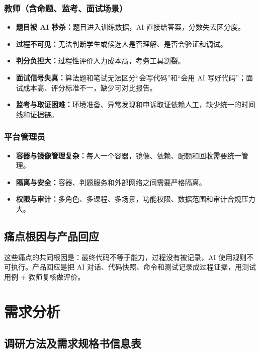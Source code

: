 \documentclass[UTF8,12pt,a4paper]{ctexart}
\begin{document}
\subsubsection{教师（含命题、监考、面试场景）}

\begin{itemize}[leftmargin=2em]
  \item \textbf{题目被 AI 秒杀：}题目进入训练数据，AI 直接给答案，分数失去区分度。
  \item \textbf{过程不可见：}无法判断学生或候选人是否理解、是否会验证和调试。
  \item \textbf{判分负担大：}过程性评价人力成本高，考务工具割裂。
  \item \textbf{面试信号失真：}算法题和笔试无法区分“会写代码”和“会用 AI 写好代码”；面试成本高、评分标准不一，缺少可对比报告。
  \item \textbf{监考与取证困难：}环境准备、异常发现和申诉取证依赖人工，缺少统一的时间线和证据链。
\end{itemize}

\subsubsection{平台管理员}

\begin{itemize}[leftmargin=2em]
  \item \textbf{容器与镜像管理复杂：}每人一个容器，镜像、依赖、配额和回收需要统一管理。
  \item \textbf{隔离与安全：}容器、判题服务和外部网络之间需要严格隔离。
  \item \textbf{权限与审计：}多角色、多课程、多场景，功能权限、数据范围和审计合规压力大。
\end{itemize}

\subsection{痛点根因与产品回应}

这些痛点的共同根因是：最终代码不等于能力，过程没有被记录，AI 使用规则不可执行。产品回应是把 AI 对话、代码快照、命令和测试记录成过程证据，用测试用例 + 教师复核做评价。

\section{需求分析}

\subsection{调研方法及需求规格书信息表}
\end{document}
